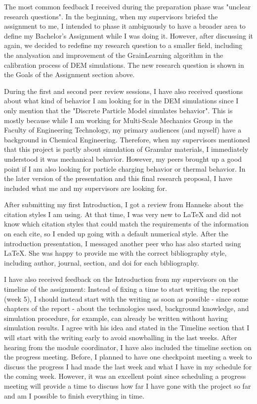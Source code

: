 \documentclass[../BachelorAssignment.tex]{subfiles}
\begin{document}
The most common feedback I received during the preparation phase was "unclear research questions". In the beginning, when my supervisors briefed the assignment to me, I intended to phase it ambiguously to have a broader area to define my Bachelor's Assignment while I was doing it. However, after discussing it again, we decided to redefine my research question to a smaller field, including the analysation and improvement of the GrainLearning algorithm in the calibration process of DEM simulations. The new research question is shown in the Goals of the Assignment section above. 
\par
During the first and second peer review sessions, I have also received questions about what kind of behavior I am looking for in the DEM simulations since I only mention that the "Discrete Particle Model simulates behavior". This is mostly because while I am working for Multi-Scale Mechanics Group in the Faculty of Engineering Technology, my primary audiences (and myself) have a background in Chemical Engineering. Therefore, when my supervisors mentioned that this project is partly about simulation of Granular materials, I immediately understood it was mechanical behavior. However, my peers brought up a good point if I am also looking for particle charging behavior or thermal behavior. In the later version of the presentation and this final research proposal, I have included what me and my supervisors are looking for. 
\par
After submitting my first Introduction, I got a review from Hanneke about the citation styles I am using. At that time, I was very new to LaTeX and did not know which citation styles that could match the requirements of the information on each cite, so I ended up going with a default numerical style. After the introduction presentation, I messaged another peer who has also started using LaTeX. She was happy to provide me with the correct bibliography style, including author, journal, section, and doi for each bibliography. 

I have also received feedback on the Introduction from my supervisors on the timeline of the assignment: Instead of fixing a time to start writing the report (week 5), I should instead start with the writing as soon as possible - since some chapters of the report - about the technologies used, background knowledge, and simulation procedure, for example, can already be written without having simulation results. I agree with his idea and stated in the Timeline section that I will start with the writing early to avoid snowballing in the last weeks. After hearing from the module coordinator, I have also included the timeline section on the progress meeting. Before, I planned to have one checkpoint meeting a week to discuss the progress I had made the last week and what I have in my schedule for the coming week. However, it was an excellent point since scheduling a progress meeting will provide a time to discuss how far I have gone with the project so far and am I possible to finish everything in time. 
\end{document}
